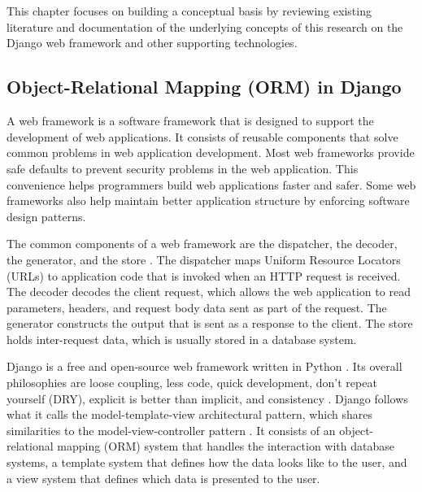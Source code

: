 \chapter{\babDua}

This chapter focuses on building a conceptual basis by reviewing existing
literature and documentation of the underlying concepts of this research
on the Django web framework and other supporting technologies.

\section{Object-Relational Mapping (ORM) in Django}

A web framework is a software framework that is designed to support the
development of web applications. It consists of reusable components that solve
common problems in web application development. Most web frameworks provide
safe defaults to prevent security problems in the web application. This
convenience helps programmers build web applications faster and safer. Some web
frameworks also help maintain better application structure by enforcing
software design patterns.

The common components of a web framework are the dispatcher, the decoder, the
generator, and the store \cite{schwarz_webframework}. The dispatcher maps
Uniform Resource Locators (URLs) to application code that is invoked when an
HTTP request is received. The decoder decodes the client request, which allows
the web application to read parameters, headers, and request body data sent as
part of the request. The generator constructs the output that is sent as a
response to the client. The store holds inter-request data, which is usually
stored in a database system.

Django is a free and open-source web framework written in Python \cite{django}.
Its overall philosophies are loose coupling, less code, quick development,
don't repeat yourself (DRY), explicit is better than implicit, and consistency
\cite{django:philosophies}. Django follows what it calls the
model-template-view architectural pattern, which shares similarities to the
model-view-controller pattern \cite{django:faq}. It consists of an
object-relational mapping (ORM) system that handles the interaction with
database systems, a template system that defines how the data looks like to the
user, and a view system that defines which data is presented to the user.

